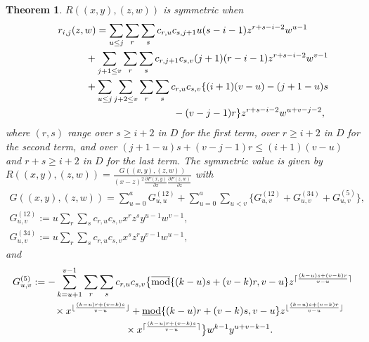 \documentclass[pdftex]{sigma}
\numberwithin{equation}{section}
\newtheorem{teiri}{Theorem}[section]
\theoremstyle{definition}
\begin{document}
\begin{teiri}\label{theorem1}
$R((x,y),(z,w))$ is symmetric when
\begin{gather}
 r_{i,j}(z,w) =\sum_{u\leq j}\sum_{r}\sum_{s}c_{r,u}c_{s,j+1}u(s-i-1)z^{r+s-i-2}w^{u-1}\label{eq21}\\
\hphantom{r_{i,j}(z,w) =}{} +\sum_{j+1\leq v}\sum_{r}\sum_{s}c_{r,j+1}c_{s,v}(j+1)(r-i-1)z^{r+s-i-2}w^{v-1}\label{eq22}\\
\hphantom{r_{i,j}(z,w) =}{} +\sum_{u\leq j}\sum_{j+2\leq v}\sum_{r}\sum_{s}c_{r,u}c_{s,v}\{(i+1)(v-u)-(j+1-u)s\nonumber\\
\hphantom{r_{i,j}(z,w) =+\sum_{u\leq j}\sum_{j+2\leq v}\sum_{r}\sum_{s}}{} -(v-j-1)r\}z^{r+s-i-2}w^{u+v-j-2}, \label{eq91}
\end{gather}
where $(r,s)$ range over $s\geq i+2$ in $D$ for the first term, over $r\geq i+2$ in $D$ for the second term, and over $(j+1-u)s+(v-j-1)r\leq (i+1)(v-u)$ and $r+s\geq i+2$ in $D$ for the last term. The symmetric value is given by $ R((x,y),(z,w))=\frac{G((x,y),(z,w))}{(x-z)^2\frac{\partial F(x,y)}{\partial x}\frac{\partial F(z,w)}{\partial z}}$ with
\begin{gather}G((x,y),(z,w))=\sum_{u=0}^aG_{u,u}^{(12)}
+\sum_{u=0}^a\sum_{u< v}\big\{G_{u,v}^{(12)}+G_{u,v}^{(34)}+G^{(5)}_{u,v}\big\},\nonumber\\ \label{eq24}
G^{(12)}_{u,v}:=u\sum_r\sum_sc_{r,u}c_{s,v}x^rz^sy^{u-1}w^{v-1},
\\ \label{eq25}
G^{(34)}_{u,v}:=u\sum_r\sum_sc_{r,u}c_{s,v}x^sz^ry^{v-1}w^{u-1},
\end{gather}
and
\begin{gather}
 G^{(5)}_{u,v} :=-\sum_{k=u+1}^{v-1}\sum_r\sum_sc_{r,u}c_{s,v}
\big\{
\overline{\rm mod}\{(k-u)s+(v-k)r,v-u\}
z^{ \lceil\frac{(k-u)s+(v-k)r}{v-u}\rceil}
\nonumber\\
\hphantom{G^{(5)}_{u,v} :=}{}
\times x^{ \lfloor\frac{(k-u)r+(v-k)s}{v-u}\rfloor}+
\underline{\rm mod}\{(k-u)r+(v-k)s,v-u\}
z^{ \lfloor\frac{(k-u)s+(v-k)r}{v-u}\rfloor}
\nonumber\\
\hphantom{G^{(5)}_{u,v} :=}{}
\times x^{ \lceil\frac{(k-u)r+(v-k)s}{v-u}\rceil}\big\} w^{k-1}y^{u+v-k-1}. \label{eq181}
\end{gather}
\end{teiri}
\end{document}
